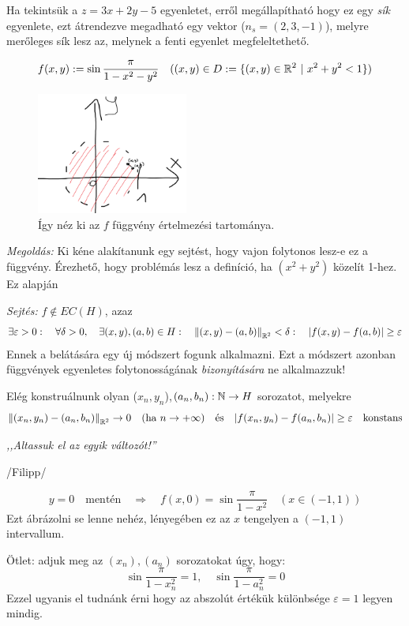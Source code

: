 \documentclass[a4paper,11.5pt]{article}
\newcommand{\norm}[1]{\left\lVert#1\right\rVert}
\begin{document}
	\begin{note}
		Ha tekintsük a $z=3x+2y-5$ egyenletet, erről megállapítható hogy ez egy \textit{sík} egyenlete, ezt átrendezve megadható egy vektor ($n_s=(2,3,-1)$), melyre merőleges sík lesz az, melynek a fenti egyenlet megfeleltethető.
	\end{note}
	\begin{task}
		\[ f(x,y):=\sin\frac{\pi}{1-x^2-y^2} \quad ((x,y)\in D:=\{ (x,y)\in\mathbb{R}^2 \ | \ x^2+y^2<1 \}) \]
		
		
		\begin{figure}[H]
			\centering
			\includegraphics[height=4cm]{../2zh/kepek/53.png}
			\caption{Így néz ki az $f$ függvény értelmezési tartománya.}
		\end{figure}
		
		
		\textit{Megoldás:} Ki kéne alakítanunk egy sejtést, hogy vajon folytonos lesz-e ez a függvény. Érezhető, hogy problémás lesz a definíció, ha $(x^2+y^2)$ közelít 1-hez. Ez alapján
		
		\textit{Sejtés:} $f\notin EC(H)$, azaz
		\[ \exists\varepsilon>0:\quad \forall\delta>0,\quad \exists(x,y),(a,b)\in H:\quad \norm{(x,y)-(a,b)}_{\R^2}<\delta:\quad |f(x,y)-f(a,b)|\geq \varepsilon  \]
		Ennek a belátására egy új módszert fogunk alkalmazni. Ezt a módszert azonban függvények egyenletes folytonosságának \textit{bizonyítására} ne alkalmazzuk!
		
		Elég konstruálnunk olyan ($x_n,y_n$),$(a_n,b_n):\mathbb{N}\to H$ sorozatot, melyekre
		\[ \norm{(x_n,y_n)-(a_n,b_n)}_{\R^2}\to0\quad (\text{ha } n\to+\infty)\quad \text{és}\quad |f(x_n,y_n)-f(a_n,b_n)|\geq \varepsilon\quad \text{konstans} \] 
		\begin{center}
			\textit{,,Altassuk el az egyik változót!''}
			
			/Filipp/
		\end{center}
		\[ y=0\quad \text{mentén}\quad \Rightarrow\quad f(x,0)=\sin\frac{\pi}{1-x^2}\quad (x\in(-1,1)) \]
		Ezt ábrázolni se lenne nehéz, lényegében ez az $x$ tengelyen a $(-1,1)$ intervallum.
		
		Ötlet: adjuk meg az $(x_n),(a_n)$ sorozatokat úgy, hogy:
		\[ \sin\frac{\pi}{1-x_n^2}=1,\quad \sin\frac{\pi}{1-a_n^2}=0 \] 
		Ezzel ugyanis el tudnánk érni hogy az abszolút értékük különbsége $\varepsilon=1$ legyen mindig.
		

\end{task}
\end{document}
